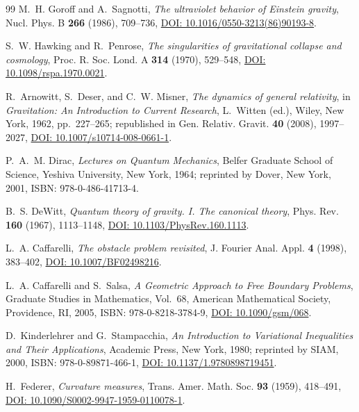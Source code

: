 \documentclass[11pt,a4paper,reqno]{amsart}
\theoremstyle{definition}
\numberwithin{equation}{section}
\begin{document}
\begin{thebibliography}{99}
M.~H. Goroff and A.~Sagnotti,
\emph{The ultraviolet behavior of Einstein gravity},
Nucl. Phys. B \textbf{266} (1986), 709--736, \href{https://doi.org/10.1016/0550-3213(86)90193-8}{DOI: 10.1016/0550-3213(86)90193-8}.

S.~W. Hawking and R.~Penrose,
\emph{The singularities of gravitational collapse and cosmology},
Proc. R. Soc. Lond. A \textbf{314} (1970), 529--548, \href{https://doi.org/10.1098/rspa.1970.0021}{DOI: 10.1098/rspa.1970.0021}.

R.~Arnowitt, S.~Deser, and C.~W. Misner,
\emph{The dynamics of general relativity},
in \emph{Gravitation: An Introduction to Current Research}, L.~Witten (ed.), Wiley, New York, 1962, pp.~227--265; republished in Gen. Relativ. Gravit. \textbf{40} (2008), 1997--2027, \href{https://doi.org/10.1007/s10714-008-0661-1}{DOI: 10.1007/s10714-008-0661-1}.

P.~A.~M. Dirac,
\emph{Lectures on Quantum Mechanics},
Belfer Graduate School of Science, Yeshiva University, New York, 1964; reprinted by Dover, New York, 2001, ISBN: 978-0-486-41713-4.

B.~S. DeWitt,
\emph{Quantum theory of gravity. I. The canonical theory},
Phys. Rev. \textbf{160} (1967), 1113--1148, \href{https://doi.org/10.1103/PhysRev.160.1113}{DOI: 10.1103/PhysRev.160.1113}.

L.~A. Caffarelli,
\emph{The obstacle problem revisited},
J. Fourier Anal. Appl. \textbf{4} (1998), 383--402, \href{https://doi.org/10.1007/BF02498216}{DOI: 10.1007/BF02498216}.

L.~A. Caffarelli and S.~Salsa,
\emph{A Geometric Approach to Free Boundary Problems},
Graduate Studies in Mathematics, Vol.~68, American Mathematical Society, Providence, RI, 2005, ISBN: 978-0-8218-3784-9, \href{https://doi.org/10.1090/gsm/068}{DOI: 10.1090/gsm/068}.

D.~Kinderlehrer and G.~Stampacchia,
\emph{An Introduction to Variational Inequalities and Their Applications},
Academic Press, New York, 1980; reprinted by SIAM, 2000, ISBN: 978-0-89871-466-1, \href{https://doi.org/10.1137/1.9780898719451}{DOI: 10.1137/1.9780898719451}.

H.~Federer,
\emph{Curvature measures},
Trans. Amer. Math. Soc. \textbf{93} (1959), 418--491, \href{https://doi.org/10.1090/S0002-9947-1959-0110078-1}{DOI: 10.1090/S0002-9947-1959-0110078-1}.


\end{thebibliography}
\end{document}
